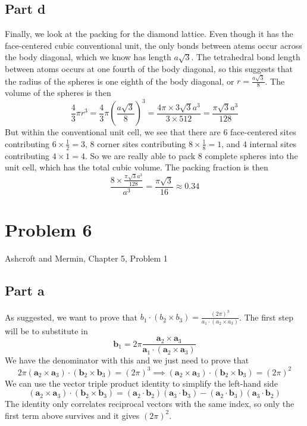 \documentclass[12pt]{article}
\begin{document}
\subsection{Part d}
Finally, we look at the packing for the diamond lattice. Even though it has the face-centered cubic conventional unit, the only bonds between atems occur across the body diagonal, which we know has length \(a\sqrt{3}\). The tetrahedral bond length between atoms occurs at one fourth of the body diagonal, so this suggests that the radius of the spheres is one eighth of the body diagonal, or \(r = \frac{a\sqrt{3}}{8}\). The volume of the spheres is then
\begin{equation}
    \frac{4}{3}\pi r^3 = \frac{4}{3}\pi \left(\frac{a\sqrt{3}}{8}\right)^3 = \frac{4\pi \times 3\sqrt{3}a^3}{3 \times 512} = \frac{\pi\sqrt{3}a^3}{128}
\end{equation}
But within the conventional unit cell, we see that there are 6 face-centered sites contributing $6\times\frac{1}{2} = 3$, 8 corner sites contributing $8\times\frac{1}{8} = 1$, and 4 internal sites contributing $4\times 1 = 4$. So we are really able to pack 8 complete spheres into the unit cell, which has the total cubic volume. The packing fraction is then
\begin{equation}
    \frac{8 \times \frac{\pi\sqrt{3}a^3}{128}}{a^3} = \frac{\pi\sqrt{3}}{16} \approx 0.34
\end{equation}

\section{Problem 6}
Ashcroft and Mermin, Chapter 5, Problem 1
\subsection{Part a}
As suggested, we want to prove that $b_1 \cdot\left(b_2 \times b_3\right)=\frac{(2 \pi)^3}{a_1 \cdot\left(a_2 \times a_3\right)}$. The first step will be to substitute in 
\begin{equation}
\mathbf{b}_1=2 \pi \frac{\mathbf{a}_2 \times \mathbf{a}_3}{\mathbf{a}_1 \cdot\left(\mathbf{a}_2 \times \mathbf{a}_3\right)}
\end{equation}
We have the denominator with this and we just need to prove that
\begin{equation}
    2 \pi (\mathbf{a}_2 \times \mathbf{a}_3) \cdot\left(\mathbf{b}_2 \times \mathbf{b}_3\right)=(2 \pi)^3 \implies (\mathbf{a}_2 \times \mathbf{a}_3) \cdot\left(\mathbf{b}_2 \times \mathbf{b}_3\right)=(2 \pi)^2
\end{equation}
We can use the vector triple product identity to simplify the left-hand side
\begin{equation}
    (\mathbf{a}_2 \times \mathbf{a}_3) \cdot\left(\mathbf{b}_2 \times \mathbf{b}_3\right) = (\mathbf{a}_2 \cdot \mathbf{b}_2)(\mathbf{a}_3 \cdot \mathbf{b}_3) - (\mathbf{a}_2 \cdot \mathbf{b}_3)(\mathbf{a}_3 \cdot \mathbf{b}_2)
\end{equation}
The identity only correlates reciprocal vectors with the same index, so only the first term above survives and it gives $(2\pi)^2$.
\end{document}
